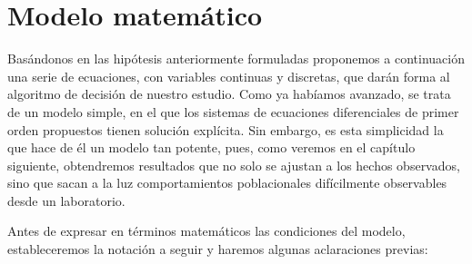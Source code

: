 \section{Modelo matemático}
\label{sec:modelo}

Basándonos en las hipótesis anteriormente formuladas proponemos a continuación una serie de ecuaciones, con variables continuas y discretas, que darán forma al algoritmo de decisión de nuestro estudio. Como ya habíamos avanzado, se trata de un modelo simple, en el que los sistemas de ecuaciones diferenciales de primer orden propuestos tienen solución explícita. Sin embargo, es esta simplicidad la que hace de él un modelo tan potente, pues, como veremos en el capítulo siguiente, obtendremos resultados que no solo se ajustan a los hechos observados, sino que sacan a la luz comportamientos poblacionales difícilmente observables desde un laboratorio.

Antes de expresar en términos matemáticos las condiciones del modelo, estableceremos la notación a seguir y haremos algunas aclaraciones previas: 

